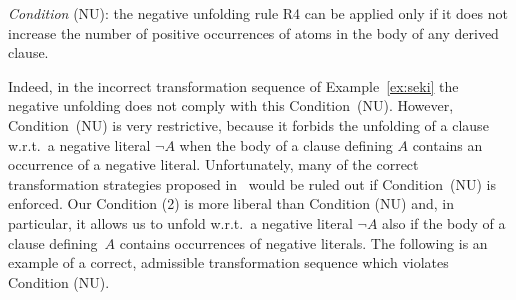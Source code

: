 \documentclass[english]{tlp}
\begin{document}
\smallskip \noindent
{\em{Condition}} (NU):
the negative unfolding rule R4 can be applied only if it does not
increase the number of positive occurrences of atoms in
the body of any derived clause. 

\smallskip \noindent
Indeed, in the incorrect transformation
sequence of Example~\ref{ex:seki} the negative unfolding does not
comply with this Condition~(NU).
However, Condition~(NU) is very restrictive, because it forbids  the
unfolding of a clause w.r.t.~a negative literal $\neg A$ when
 the body of a clause defining $A$ contains an occurrence of a
negative literal. Unfortunately, many of the correct
transformation strategies proposed in~\cite{PeP00a,Fi&04a} would be
ruled out if Condition~(NU) is enforced. Our Condition (2) is more
liberal than Condition (NU) and, in particular, it allows us to
unfold w.r.t.~a negative literal $\neg A$ also if the body of a
clause defining~$A$ contains occurrences of negative literals.
The following is an example of a correct, admissible transformation 
sequence which violates Condition (NU).
\end{document}
